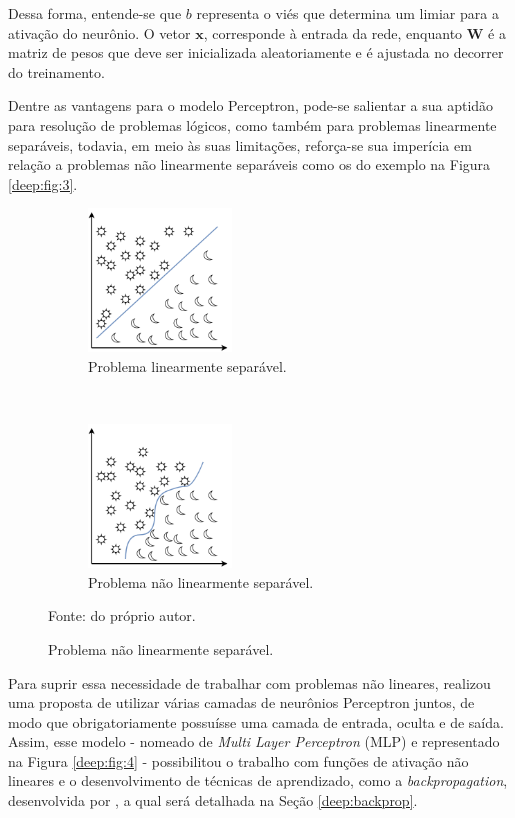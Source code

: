 Dessa forma, entende-se que $b$ representa o viés que determina um limiar para a ativação do neurônio. O vetor $\textbf{x}$, corresponde à entrada da rede, enquanto $\textbf{W}$ é a matriz de pesos que deve ser inicializada aleatoriamente e é ajustada no decorrer do treinamento.

Dentre as vantagens para o modelo Perceptron, pode-se salientar a sua aptidão para resolução de problemas lógicos, como também para problemas linearmente separáveis, todavia, em meio às suas limitações, reforça-se sua imperícia em relação a problemas não linearmente separáveis como os do exemplo na Figura \ref{deep:fig:3}.

\begin{figure}[H]
   \caption{Representação de problemas linearmente e não linearmente separáveis.}
   \centering
   \label{deep:fig:3}
    \begin{subfigure}[t]{0.45\textwidth}
        \centering
        \includegraphics[height=1.5in]{recursos/imagens/deep/l_separavel.png}
        \caption{Problema linearmente separável.}
        \label{deep:fig:3.1}
    \end{subfigure}%
    ~ 
    \begin{subfigure}[t]{0.45\textwidth}
        \centering
        \includegraphics[height=1.5in]{recursos/imagens/deep/nl_separavel.png}
        \caption{Problema não linearmente separável.}
        \label{deep:fig:3.2}
    \end{subfigure}%

    Fonte: do próprio autor.
\end{figure}

Para suprir essa necessidade de trabalhar com problemas não lineares, \cite{Werbos:74} realizou uma proposta de utilizar várias camadas de neurônios Perceptron juntos, de modo que obrigatoriamente possuísse uma camada de entrada, oculta e de saída. Assim, esse modelo - nomeado de \textit{Multi Layer Perceptron} (MLP) \citep{Werbos:74} e representado na Figura \ref{deep:fig:4} - possibilitou o trabalho com funções de ativação não lineares e o desenvolvimento de técnicas de aprendizado, como a \textit{backpropagation}, desenvolvida por \cite{rumelhart1986learning}, a qual será detalhada na Seção \ref{deep:backprop}.

